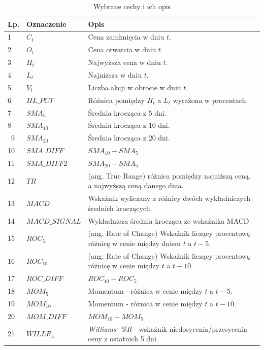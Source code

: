 \documentclass[a4paper, twoside, 11pt, openright]{article}
\begin{document}
\begin{longtable}[c]{| m{0.5cm} m{5cm} m{10cm}|} 

\toprule
  Lp. & Oznaczenie & Opis\\
\midrule
\endhead
\midrule

\caption{Wybrane cechy i ich opis}
\label{tab:data_columns_table}
\endfoot

\bottomrule
\caption{Wybrane cechy i ich opis}
\label{tab:data_columns_table}
\endlastfoot


 1 & $C_t$ & Cena zamknięcia w dniu $t$. \\ 
 2 & $O_t$ & Cena otwarcia w dniu $t$. \\
 3 & $H_t$ & Najwyższa cena w dniu $t$. \\
 4 & $L_t$ & Najniższa w dniu $t$. \\
 5 & $V_t$ & Liczba akcji w obrocie w dniu $t$. \\
 6 & $HL\_PCT$ & Różnica pomiędzy $H_t$ a $L_t$ wyrażona w procentach.\\
 7 & $SMA_5$ & Średnia krocząca z 5 dni. \\
 8 & $SMA_{10}$ & Średnia krocząca z 10 dni. \\\
  9 & $SMA_{20}$ & Średnia krocząca z 20 dni. \\
 10 & $SMA\_DIFF$ & $SMA_{10}-SMA_{5}$ \\
 11 & $SMA\_DIFF2$ & $SMA_{20}-SMA_{5}$ \\
 12 & $TR$ & (ang. True Range) różnica pomiędzy najniższą ceną, a najwyższą ceną danego dnia. \\
 13 & $MACD$ & Wskaźnik wyliczany z różnicy dwóch wykładniczych średnich kroczących.\\
 14 & $MACD\_SIGNAL$ & Wykładnicza średnia krocząca ze wskaźnika MACD \\
 15 & $ROC_{5}$ & (ang. Rate of Change) Wskaźnik liczący procentową różnicę w cenie między dniem $t$ a $t-5$. \\
 16 & $ROC_{10}$ & (ang. Rate of Change) Wskaźnik liczący procentową różnicę w cenie między $t$ a $t-10$. \\
 17 & $ROC\_DIFF$ & $ROC_{10}-ROC_{5}$ \\
  18 & $MOM_{5}$ & Momentum - różnica w cenie między $t$ a $t-5$.  \\
 19 & $MOM_{10}$ & Momentum - różnica w cenie między $t$ a $t-10$. \\
 20 & $MOM\_DIFF$ & $MOM_{10}-MOM_{5}$ \\
  21 & $WILLR_{5}$ & \textit{Williams` \%R} - wskaźnik niedosycenia/przesycenia ceny z ostatnich 5 dni. \\

\end{longtable}
\end{document}
